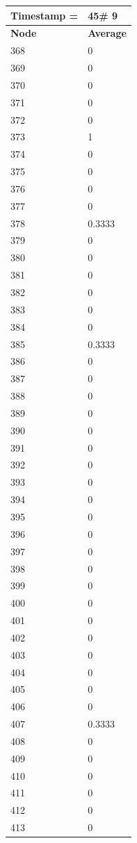 \begin{tabular}{|l||l|}
\hline
\textbf{Timestamp =} & \textbf{45}\# 9\\\hline
	\textbf{Node} & \textbf{Average} \\ \hline
\hline
	368 & 0 \\ \hline
	369 & 0 \\ \hline
	370 & 0 \\ \hline
	371 & 0 \\ \hline
	372 & 0 \\ \hline
	373 & 1 \\ \hline
	374 & 0 \\ \hline
	375 & 0 \\ \hline
	376 & 0 \\ \hline
	377 & 0 \\ \hline
	378 & 0.3333 \\ \hline
	379 & 0 \\ \hline
	380 & 0 \\ \hline
	381 & 0 \\ \hline
	382 & 0 \\ \hline
	383 & 0 \\ \hline
	384 & 0 \\ \hline
	385 & 0.3333 \\ \hline
	386 & 0 \\ \hline
	387 & 0 \\ \hline
	388 & 0 \\ \hline
	389 & 0 \\ \hline
	390 & 0 \\ \hline
	391 & 0 \\ \hline
	392 & 0 \\ \hline
	393 & 0 \\ \hline
	394 & 0 \\ \hline
	395 & 0 \\ \hline
	396 & 0 \\ \hline
	397 & 0 \\ \hline
	398 & 0 \\ \hline
	399 & 0 \\ \hline
	400 & 0 \\ \hline
	401 & 0 \\ \hline
	402 & 0 \\ \hline
	403 & 0 \\ \hline
	404 & 0 \\ \hline
	405 & 0 \\ \hline
	406 & 0 \\ \hline
	407 & 0.3333 \\ \hline
	408 & 0 \\ \hline
	409 & 0 \\ \hline
	410 & 0 \\ \hline
	411 & 0 \\ \hline
	412 & 0 \\ \hline
	413 & 0 \\ \hline
\end{tabular}

